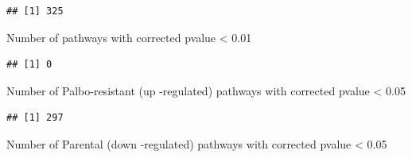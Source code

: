 \documentclass[
]{book}
\newenvironment{Shaded}{\begin{snugshade}}{\end{snugshade}}
\newcommand{\DecValTok}[1]{\textcolor[rgb]{0.00,0.00,0.81}{#1}}
\newcommand{\FloatTok}[1]{\textcolor[rgb]{0.00,0.00,0.81}{#1}}
\newcommand{\FunctionTok}[1]{\textcolor[rgb]{0.13,0.29,0.53}{\textbf{#1}}}
\newcommand{\NormalTok}[1]{#1}
\newcommand{\SpecialCharTok}[1]{\textcolor[rgb]{0.81,0.36,0.00}{\textbf{#1}}}
\begin{document}
\begin{Shaded}
\end{Shaded}

\begin{verbatim}
## [1] 325
\end{verbatim}

Number of pathways with corrected pvalue \textless{} 0.01

\begin{Shaded}
\end{Shaded}

\begin{verbatim}
## [1] 0
\end{verbatim}

Number of Palbo-resistant (up -regulated) pathways with corrected pvalue \textless{} 0.05

\begin{Shaded}
\end{Shaded}

\begin{verbatim}
## [1] 297
\end{verbatim}

Number of Parental (down -regulated) pathways with corrected pvalue \textless{} 0.05

\begin{Shaded}
\end{Shaded}
\end{document}
